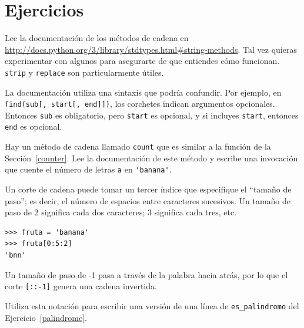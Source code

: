 \documentclass[10pt]{book}
\begin{document}
\section{Ejercicios}

\begin{exercise}

Lee la documentación de los métodos de cadena en
\url{http://docs.python.org/3/library/stdtypes.html#string-methods}.
Tal vez quieras experimentar con algunos para asegurarte de que
entiendes cómo funcionan.  {\tt strip} y {\tt replace} son
particularmente útiles.

La documentación utiliza una sintaxis que podría confundir.
Por ejemplo, en \verb"find(sub[, start[, end]])", los corchetes
indican argumentos opcionales.  Entonces {\tt sub} es obligatorio, pero
{\tt start} es opcional, y si incluyes {\tt start},
entonces {\tt end} es opcional.

\end{exercise}


\begin{exercise}

Hay un método de cadena llamado {\tt count} que es similar
a la función de la Sección~\ref{counter}.  Lee la documentación
de este método
y escribe una invocación que cuente el número de letras {\tt a}
en \verb"'banana'".
\end{exercise}


\begin{exercise}

Un corte de cadena puede tomar un tercer índice que especifique el ``tamaño
de paso''; es decir, el número de espacios entre caracteres sucesivos.
Un tamaño de paso de 2 significa cada dos caracteres; 3 significa cada tres,
etc.

\begin{verbatim}
>>> fruta = 'banana'
>>> fruta[0:5:2]
'bnn'
\end{verbatim}

Un tamaño de paso de -1 pasa a través de la palabra hacia atrás, por lo que
el corte \verb"[::-1]" genera una cadena invertida.

Utiliza esta notación para escribir una versión de una línea de \verb"es_palindromo"
del Ejercicio~\ref{palindrome}.
\end{exercise}
\end{document}
